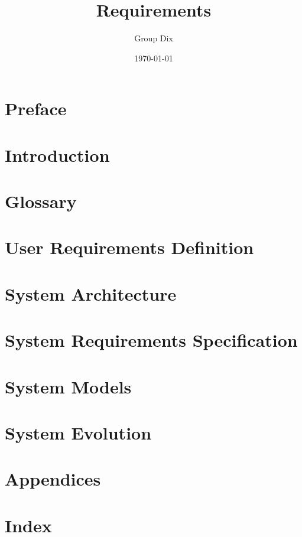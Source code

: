 \documentclass[11pt]{article}
\title{Requirements}
\author{Group Dix}
\date{\today}
\begin{document}
\maketitle

\section{Preface}
\section{Introduction}
\section{Glossary}
\section{User Requirements  Definition}
\section{System Architecture}
\section{System Requirements Specification}
\section{System Models}
\section{System Evolution}
\section{Appendices}
\section{Index}
\end{document}
